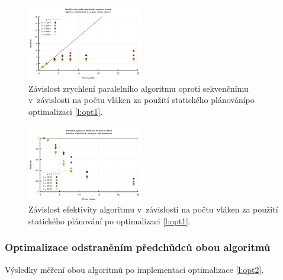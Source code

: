 \begin{figure}
    \centering
    \includegraphics[width=0.45\textwidth]{../grafy/02_openMP/02-02-Floyd_zrychleni_v2}
    \caption{Závislost zrychlení paralelního algoritmu oproti sekvenčnímu v~závislosti na počtu vláken za použití statického plánovánípo optimalizaci \ref{l:opt1}.}
    \label{f:mer:zry:opt1}
\end{figure}

\begin{figure}
    \centering
    \includegraphics[width=0.45\textwidth]{../grafy/02_openMP/02-03-Floyd_efektivita_v2}
    \caption{Závislost efektivity algoritmu v~závislosti na počtu vláken za použití statického plánování po optimalizaci \ref{l:opt1}.}
    \label{f:mer:efe:opt1}
\end{figure}

\subsubsection{Optimalizace odstraněním předchůdců obou algoritmů} \label{l:mer:opt2}
Výsledky měření obou algoritmů po implementaci optimalizace \ref{l:opt2}.

